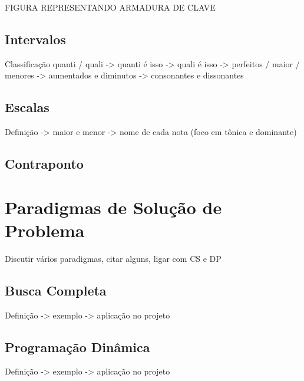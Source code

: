       FIGURA REPRESENTANDO ARMADURA DE CLAVE

      \subsection[Intervalos]{Intervalos}

        Classificação quanti / quali -> quanti é isso -> quali é isso -> perfeitos / maior / menores -> aumentados e diminutos -> consonantes e dissonantes
      \subsection[Escalas]{Escalas}
        Definição -> maior e menor -> nome de cada nota (foco em tônica e dominante)
      \subsection[Contraponto]{Contraponto}

    \section[Paradigmas de Solução de Problema]{Paradigmas de Solução de Problema}
      Discutir vários paradigmas, citar alguns, ligar com CS e DP

      \subsection[Busca Completa]{Busca Completa}
        Definição -> exemplo -> aplicação no projeto
      \subsection[Programação Dinâmica]{Programação Dinâmica}
        Definição -> exemplo -> aplicação no projeto
